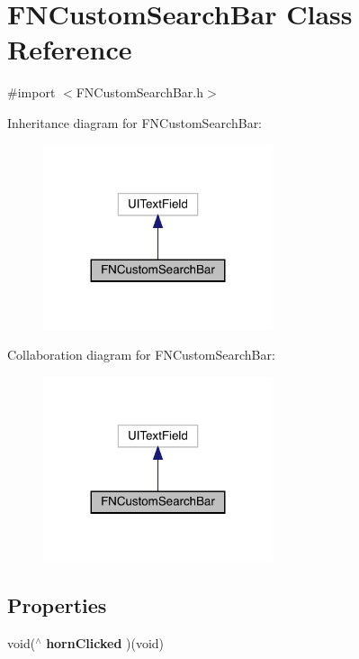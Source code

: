 \hypertarget{interface_f_n_custom_search_bar}{}\section{F\+N\+Custom\+Search\+Bar Class Reference}
\label{interface_f_n_custom_search_bar}


{\ttfamily \#import $<$F\+N\+Custom\+Search\+Bar.\+h$>$}



Inheritance diagram for F\+N\+Custom\+Search\+Bar\+:\nopagebreak
\begin{figure}[H]
\begin{center}
\leavevmode
\includegraphics[width=191pt]{interface_f_n_custom_search_bar__inherit__graph}
\end{center}
\end{figure}


Collaboration diagram for F\+N\+Custom\+Search\+Bar\+:\nopagebreak
\begin{figure}[H]
\begin{center}
\leavevmode
\includegraphics[width=191pt]{interface_f_n_custom_search_bar__coll__graph}
\end{center}
\end{figure}
\subsection*{Properties}
\begin{DoxyCompactItemize}
\item 
\mbox{\label{interface_f_n_custom_search_bar_aa468871e17140a87cd5a066259fd5747}} 
void($^\wedge$ {\bfseries horn\+Clicked} )(void)
\end{DoxyCompactItemize}


